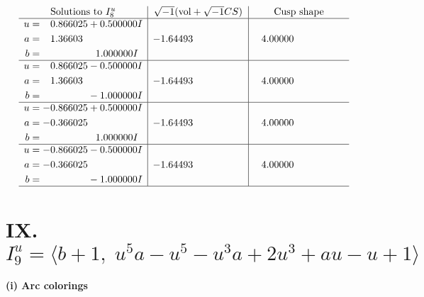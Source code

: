 \documentclass[1p]{elsarticle_modified}
\theoremstyle{definition}
\newcommand{\I}{\sqrt{-1}}
\begin{document}
$$\begin{array}{c|c|c}  
\text{Solutions to }I^u_{8}& \I (\text{vol} + \sqrt{-1}CS) & \text{Cusp shape}\\
 \hline 
\begin{aligned}
u &= \phantom{-}0.866025 + 0.500000 I \\
a &= \phantom{-}1.36603\phantom{ +0.000000I} \\
b &= \phantom{-0.000000 -}1.000000 I\end{aligned}
 & -1.64493\phantom{ +0.000000I} & \phantom{-}4.00000\phantom{ +0.000000I} \\ \hline\begin{aligned}
u &= \phantom{-}0.866025 - 0.500000 I \\
a &= \phantom{-}1.36603\phantom{ +0.000000I} \\
b &= \phantom{-0.000000 } -1.000000 I\end{aligned}
 & -1.64493\phantom{ +0.000000I} & \phantom{-}4.00000\phantom{ +0.000000I} \\ \hline\begin{aligned}
u &= -0.866025 + 0.500000 I \\
a &= -0.366025\phantom{ +0.000000I} \\
b &= \phantom{-0.000000 -}1.000000 I\end{aligned}
 & -1.64493\phantom{ +0.000000I} & \phantom{-}4.00000\phantom{ +0.000000I} \\ \hline\begin{aligned}
u &= -0.866025 - 0.500000 I \\
a &= -0.366025\phantom{ +0.000000I} \\
b &= \phantom{-0.000000 } -1.000000 I\end{aligned}
 & -1.64493\phantom{ +0.000000I} & \phantom{-}4.00000\phantom{ +0.000000I}\\
 \hline 
 \end{array}$$\newpage\newpage\renewcommand{\arraystretch}{1}
\centering \section*{IX. $I^u_{9}= \langle b+1,\;u^5 a- u^5- u^3 a+2 u^3+a u- u+1 \rangle$}
\flushleft \textbf{(i) Arc colorings}\\
\end{document}
